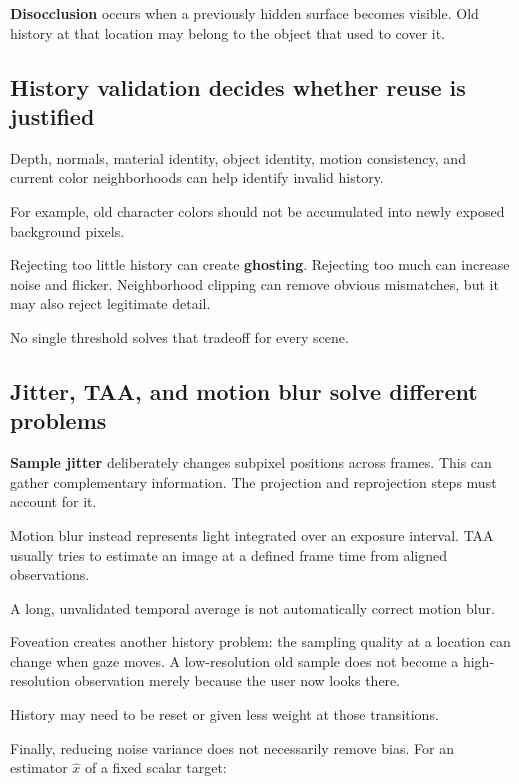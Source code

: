 \textbf{Disocclusion} occurs when a previously hidden surface becomes visible. Old history at that location may belong to the object that used to cover it.

\subsection{History validation decides whether reuse is justified}\label{04-visual-computing-ii-ch043-history-validation-decides-whether-reuse-is-justified}

Depth, normals, material identity, object identity, motion consistency, and current color neighborhoods can help identify invalid history.

For example, old character colors should not be accumulated into newly exposed background pixels.

Rejecting too little history can create \textbf{ghosting}. Rejecting too much can increase noise and flicker. Neighborhood clipping can remove obvious mismatches, but it may also reject legitimate detail.

No single threshold solves that tradeoff for every scene.

\subsection{Jitter, TAA, and motion blur solve different problems}\label{04-visual-computing-ii-ch043-jitter-taa-and-motion-blur-solve-different-problems}

\textbf{Sample jitter} deliberately changes subpixel positions across frames. This can gather complementary information. The projection and reprojection steps must account for it.

Motion blur instead represents light integrated over an exposure interval. TAA usually tries to estimate an image at a defined frame time from aligned observations.

A long, unvalidated temporal average is not automatically correct motion blur.

Foveation creates another history problem: the sampling quality at a location can change when gaze moves. A low-resolution old sample does not become a high-resolution observation merely because the user now looks there.

History may need to be reset or given less weight at those transitions.

Finally, reducing noise variance does not necessarily remove bias. For an estimator \(\hat x\) of a fixed scalar target:

